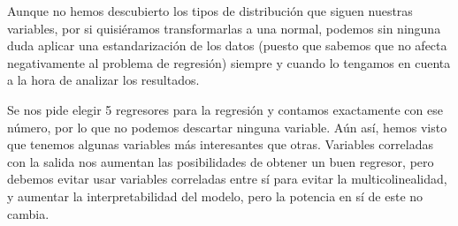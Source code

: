 \vspace{\baselineskip}

Aunque no hemos descubierto los tipos de distribución que siguen nuestras variables, por si quisiéramos transformarlas a una normal, podemos sin ninguna duda aplicar una estandarización de los datos (puesto que sabemos que no afecta negativamente al problema de regresión) siempre y cuando lo tengamos en cuenta a la hora de analizar los resultados.

\vspace{\baselineskip}

Se nos pide elegir 5 regresores para la regresión y contamos exactamente con ese número, por lo que no podemos descartar ninguna variable. Aún así, hemos visto que tenemos algunas variables más interesantes que otras. Variables correladas con la salida nos aumentan las posibilidades de obtener un buen regresor, pero debemos evitar usar variables correladas entre sí para evitar la multicolinealidad, y aumentar la interpretabilidad del modelo, pero la potencia en sí de este no cambia.